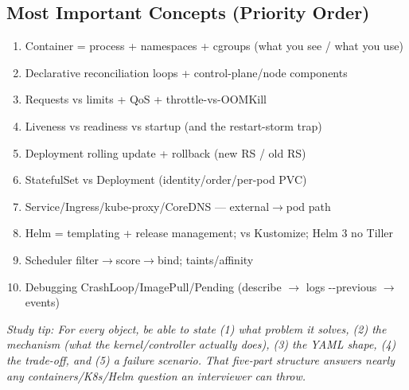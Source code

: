 \documentclass[11pt]{article}
\providecommand{\tightlist}{\setlength{\itemsep}{1pt}\setlength{\parskip}{0pt}}
\begin{document}
\subsection{Most Important Concepts (Priority Order)}\label{most-important-concepts-priority-order}

\begin{enumerate}
\def\labelenumi{\arabic{enumi}.}
\tightlist
\item
  Container = process + namespaces + cgroups (what you see / what you use)
\item
  Declarative reconciliation loops + control-plane/node components
\item
  Requests vs limits + QoS + throttle-vs-OOMKill
\item
  Liveness vs readiness vs startup (and the restart-storm trap)
\item
  Deployment rolling update + rollback (new RS / old RS)
\item
  StatefulSet vs Deployment (identity/order/per-pod PVC)
\item
  Service/Ingress/kube-proxy/CoreDNS --- external\(\rightarrow\)pod path
\item
  Helm = templating + release management; vs Kustomize; Helm 3 no Tiller
\item
  Scheduler filter\(\rightarrow\)score\(\rightarrow\)bind; taints/affinity
\item
  Debugging CrashLoop/ImagePull/Pending (describe \(\rightarrow\) logs -\/-previous \(\rightarrow\) events)
\end{enumerate}

\emph{Study tip: For every object, be able to state (1) what problem it solves, (2) the mechanism (what the kernel/controller actually does), (3) the YAML shape, (4) the trade-off, and (5) a failure scenario. That five-part structure answers nearly any containers/K8s/Helm question an interviewer can throw.}
\end{document}
